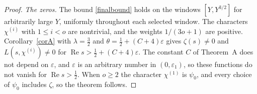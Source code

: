 \begin{proof}
\emph{The zeros.} The bound \eqref{finalbound} holds on the windows $[Y,Y^{3/2}]$ for arbitrarily large $Y$, uniformly throughout each selected window. The characters $\chi^{(i)}$ with $1\le i<o$ are nontrivial, and the weights $1/(3o+1)$ are positive. Corollary~\ref{corA} with $\lambda=\frac32$ and $\theta=\frac12+(C+4)\varepsilon$ gives $\zeta(s)\ne0$ and $L(s,\chi^{(i)})\ne0$ for $\operatorname{Re}s>\frac12+(C+4)\varepsilon$. The constant $C$ of Theorem~A does not depend on $\varepsilon$, and $\varepsilon$ is an arbitrary number in $(0,\varepsilon_1)$, so these functions do not vanish for $\operatorname{Re}s>\frac12$.
When $o\ge2$ the character $\chi^{(1)}$ is $\psi_0$, and every choice of $\psi_0$ includes $\zeta$, so the theorem follows.
\end{proof}
